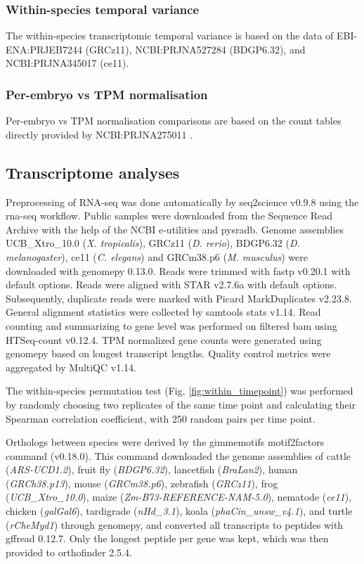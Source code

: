 \subsubsection{Within-species temporal variance}

The within-species transcriptomic temporal variance is based on the data of EBI-ENA:PRJEB7244 \cite{White2017} (GRCz11), NCBI:PRJNA527284 \cite{Liu2021} (BDGP6.32), and NCBI:PRJNA345017 \cite{Zalts2017} (ce11).

\subsubsection{Per-embryo vs TPM normalisation}

Per-embryo vs TPM normalisation comparisons are based on the count tables directly provided by NCBI:PRJNA275011 \cite{Owens2016}.

\subsection{Transcriptome analyses}

Preprocessing of RNA-seq was done automatically by seq2science v0.9.8\cite{seq2science} using the rna-seq workflow. Public samples were downloaded from the Sequence Read Archive with the help of the NCBI e-utilities and pysradb\cite{Choudhary2019}. Genome assemblies UCB\_Xtro\_10.0 (\textit{X. tropicalis}), GRCz11 (\textit{D. rerio}), BDGP6.32 (\textit{D. melanogaster}), ce11 (\textit{C. elegans}) and GRCm38.p6 (\textit{M. musculus}) were downloaded with genomepy 0.13.0\cite{Frlich2023}. Reads were trimmed with fastp v0.20.1\cite{Chen2018} with default options. Reads were aligned with STAR v2.7.6a\cite{Dobin2012} with default options. Subsequently, duplicate reads were marked with Picard MarkDuplicates v2.23.8\cite{picard}. General alignment statistics were collected by samtools stats v1.14\cite{Danecek2021}. Read counting and summarizing to gene level was performed on filtered bam using HTSeq-count v0.12.4\cite{Anders2014}. TPM normalized gene counts were generated using genomepy based on longest transcript lengths. Quality control metrics were aggregated by MultiQC v1.14\cite{Ewels2016}. 

The within-species permutation test (Fig. \ref{fig:within_timepoint}) was performed by randomly choosing two replicates of the same time point and calculating their Spearman correlation coefficient, with 250 random pairs per time point.

Orthologs between species were derived by the gimmemotifs motif2factors command (v0.18.0). This command downloaded the genome assemblies of cattle (\textit{ARS-UCD1.2}), fruit fly (\textit{BDGP6.32}), lancetfish (\textit{BraLan2}), human (\textit{GRCh38.p13}), mouse (\textit{GRCm38.p6}), zebrafish (\textit{GRCz11}), frog (\textit{UCB\_Xtro\_10.0}), maize (\textit{Zm-B73-REFERENCE-NAM-5.0}), nematode (\textit{ce11}), chicken (\textit{galGal6}), tardigrade (\textit{nHd\_3.1}),	koala (\textit{phaCin\_unsw\_v4.1}), and turtle (\textit{rCheMyd1}) through genomepy\cite{Frlich2023}, and converted all transcripts to peptides with gffread 0.12.7\cite{Pertea2020}. Only the longest peptide per gene was kept, which was then provided to orthofinder 2.5.4\cite{Emms2019}.

